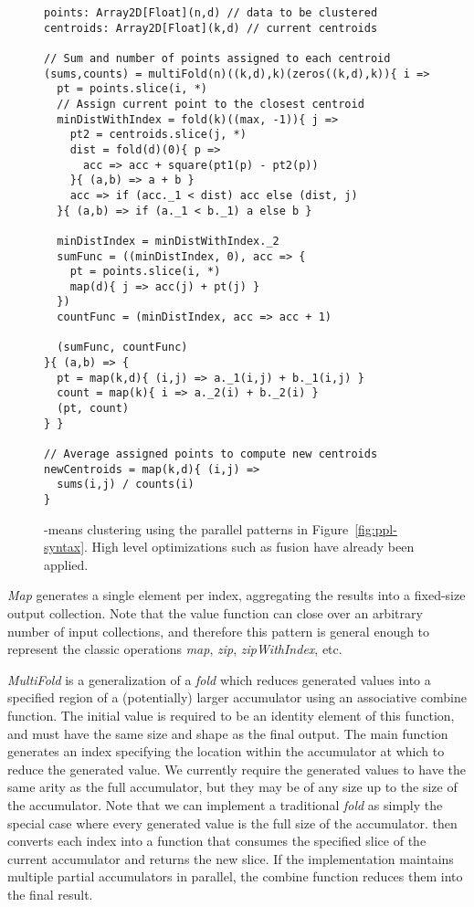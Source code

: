 \documentclass[pageno]{jpaper}
\begin{document}
\begin{figure}\centering
\begin{lstlisting}
points: Array2D[Float](n,d) // data to be clustered
centroids: Array2D[Float](k,d) // current centroids

// Sum and number of points assigned to each centroid
(sums,counts) = multiFold(n)((k,d),k)(zeros((k,d),k)){ i =>
  pt = points.slice(i, *)
  // Assign current point to the closest centroid
  minDistWithIndex = fold(k)((max, -1)){ j =>
    pt2 = centroids.slice(j, *)
    dist = fold(d)(0){ p =>
      acc => acc + square(pt1(p) - pt2(p))
    }{ (a,b) => a + b }
    acc => if (acc._1 < dist) acc else (dist, j)
  }{ (a,b) => if (a._1 < b._1) a else b }

  minDistIndex = minDistWithIndex._2
  sumFunc = ((minDistIndex, 0), acc => {
    pt = points.slice(i, *)
    map(d){ j => acc(j) + pt(j) }
  })
  countFunc = (minDistIndex, acc => acc + 1)

  (sumFunc, countFunc)
}{ (a,b) => {
  pt = map(k,d){ (i,j) => a._1(i,j) + b._1(i,j) }
  count = map(k){ i => a._2(i) + b._2(i) }
  (pt, count)
} }

// Average assigned points to compute new centroids
newCentroids = map(k,d){ (i,j) =>
  sums(i,j) / counts(i)
}
\end{lstlisting}
\caption{-means clustering using the parallel patterns in Figure~\ref{fig:ppl-syntax}. High level optimizations such as fusion have already been applied.}
\label{fig:kmeans-fused}
\end{figure}

\emph{Map} generates a single element per index, aggregating the results into a fixed-size output collection.
Note that the value function can close over an arbitrary number of input collections, and therefore this pattern is general enough to represent the classic operations \emph{map}, \emph{zip},
\emph{zipWithIndex}, etc.

\emph{MultiFold} is a generalization of a \emph{fold} which reduces generated values into a specified region of a (potentially) larger accumulator using an associative combine function.
The initial value  is required to be an identity element of this function, and must have the same size and shape as the final output.
The main function  generates an index specifying the location within the accumulator at which to reduce the generated value. We currently require the generated values to have the same arity as the full accumulator, but they may be of any size up to the size of the accumulator. Note that we can implement a traditional \emph{fold} as simply the special case where every generated value is the full size of the accumulator.
 then converts each index into a function that consumes the specified slice of the current accumulator and returns the new slice. If the implementation maintains multiple partial accumulators in parallel, the combine function  reduces them into the final result.
\end{document}
